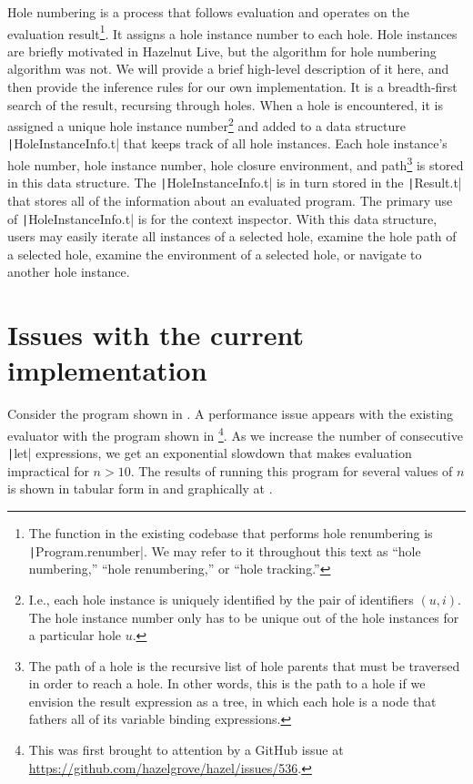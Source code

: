 Hole numbering is a process that follows evaluation and operates on the evaluation result\footnote{The function in the existing codebase that performs hole renumbering is \texttt|Program.renumber|. We may refer to it throughout this text as ``hole numbering,'' ``hole renumbering,'' or ``hole tracking.''}. It assigns a hole instance number to each hole. Hole instances are briefly motivated in Hazelnut Live, but the algorithm for hole numbering algorithm was not. We will provide a brief high-level description of it here, and then provide the inference rules for our own implementation. It is a breadth-first search of the result, recursing through holes. When a hole is encountered, it is assigned a unique hole instance number\footnote{I.e., each hole instance is uniquely identified by the pair of identifiers $(u,i)$. The hole instance number only has to be unique out of the hole instances for a particular hole $u$.} and added to a data structure \texttt|HoleInstanceInfo.t| that keeps track of all hole instances. Each hole instance's hole number, hole instance number, hole closure environment, and path\footnote{The path of a hole is the recursive list of hole parents that must be traversed in order to reach a hole. In other words, this is the path to a hole if we envision the result expression as a tree, in which each hole is a node that fathers all of its variable binding expressions.} is stored in this data structure. The \texttt|HoleInstanceInfo.t| is in turn stored in the \texttt|Result.t| that stores all of the information about an evaluated program. The primary use of \texttt|HoleInstanceInfo.t| is for the context inspector. With this data structure, users may easily iterate all instances of a selected hole, examine the hole path of a selected hole, examine the environment of a selected hole, or navigate to another hole instance.

\section{Issues with the current implementation}
\label{sec:current-problems}

Consider the program shown in . A performance issue appears with the existing evaluator with the program shown in \footnote{This was first brought to attention by a GitHub issue at \url{https://github.com/hazelgrove/hazel/issues/536}.}. As we increase the number of consecutive \texttt|let| expressions, we get an exponential slowdown that makes evaluation impractical for $n>10$. The results of running this program for several values of $n$ is shown in tabular form in  and graphically at .

